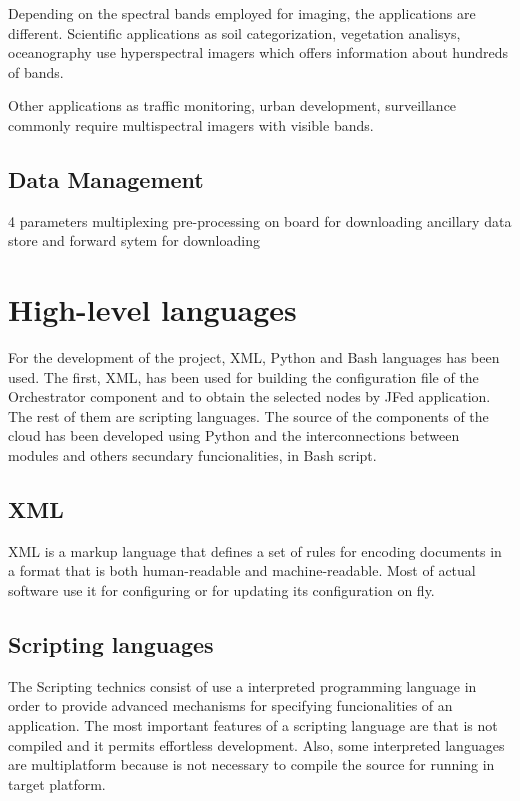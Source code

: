 Depending on the spectral bands employed for imaging, the applications are
different. Scientific applications as soil categorization, vegetation analisys,
oceanography use hyperspectral imagers which offers information about hundreds
of bands. 

Other applications as traffic monitoring, urban development,
surveillance commonly require multispectral imagers with visible bands.

\subsection{Data Management}

4 parameters
multiplexing
pre-processing on board for downloading
ancillary data
store and forward sytem for downloading










\section{High-level languages}

For the development of the project, \ac{XML}, Python and Bash languages has
been used. The first, XML, has been used for building the configuration file of
the Orchestrator component and to obtain the selected nodes by JFed
application. The rest of them are scripting languages. The source of the
components of the cloud has been developed using Python and the interconnections
between modules and others secundary funcionalities, in Bash script.

\subsection{XML}
\ac{XML} is a markup language that defines a set of rules for encoding
documents in a format that is both human-readable and machine-readable. Most of
actual software use it for configuring or for updating its configuration on fly.

\subsection{Scripting languages}

The Scripting technics consist of use a interpreted programming language in
order to provide advanced mechanisms for specifying funcionalities of an
application. The most important features of a scripting language are that is not
compiled and it permits effortless development. Also, some interpreted languages
are multiplatform because is not necessary to compile the source for running in
target platform. 


